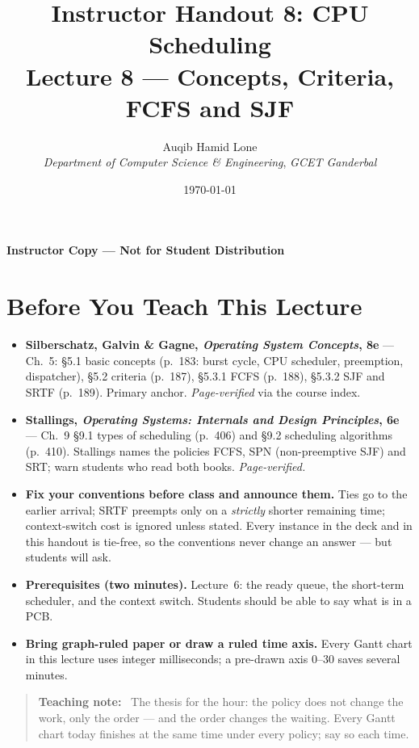 \documentclass[11pt]{article}
\title{Instructor Handout 8: CPU Scheduling\\[0.3em]
  \large Lecture 8 --- Concepts, Criteria, FCFS and SJF}
\author{Auqib Hamid Lone\\[0.3em]
  \emph{Department of Computer Science \& Engineering}, \emph{GCET Ganderbal}}
\date{\today}
\newenvironment{teachingaside}{\begin{quote}\small\color{primary-gold}\textbf{Teaching note:}\ }{\end{quote}}
\begin{document}
\maketitle
{\centering\large\color{negative}\textbf{Instructor Copy --- Not for Student Distribution}\par}
\vspace{0.5cm}

\section{Before You Teach This Lecture}

\begin{itemize}
  \item \textbf{Silberschatz, Galvin \& Gagne, \textit{Operating System Concepts}, 8e} --- Ch.~5: \S5.1 basic concepts (p.~183: burst cycle, CPU scheduler, preemption, dispatcher), \S5.2 criteria (p.~187), \S5.3.1 FCFS (p.~188), \S5.3.2 SJF and SRTF (p.~189). Primary anchor. \emph{Page-verified} via the course index.
  \item \textbf{Stallings, \textit{Operating Systems: Internals and Design Principles}, 6e} --- Ch.~9 \S9.1 types of scheduling (p.~406) and \S9.2 scheduling algorithms (p.~410). Stallings names the policies FCFS, SPN (non-preemptive SJF) and SRT; warn students who read both books. \emph{Page-verified.}
  \item \textbf{Fix your conventions before class and announce them.} Ties go to the earlier arrival; SRTF preempts only on a \emph{strictly} shorter remaining time; context-switch cost is ignored unless stated. Every instance in the deck and in this handout is tie-free, so the conventions never change an answer --- but students will ask.
  \item \textbf{Prerequisites (two minutes).} Lecture~6: the ready queue, the short-term scheduler, and the context switch. Students should be able to say what is in a PCB.
  \item \textbf{Bring graph-ruled paper or draw a ruled time axis.} Every Gantt chart in this lecture uses integer milliseconds; a pre-drawn axis 0--30 saves several minutes.
\end{itemize}

\begin{teachingaside}
The thesis for the hour: the policy does not change the work, only the order --- and the order changes the waiting. Every Gantt chart today finishes at the same time under every policy; say so each time.
\end{teachingaside}
\end{document}
